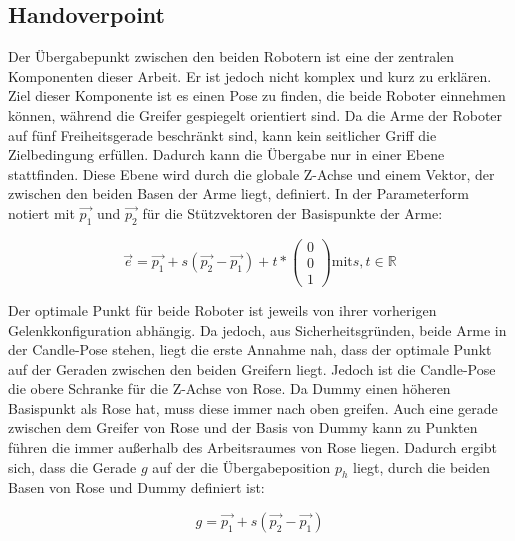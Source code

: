 \subsection{Handoverpoint}
\label{sec:impl-hop}
Der Übergabepunkt zwischen den beiden Robotern ist eine der zentralen Komponenten dieser Arbeit. Er ist jedoch nicht komplex und kurz zu erklären. Ziel dieser Komponente ist es einen Pose zu finden, die beide Roboter einnehmen können, während die Greifer gespiegelt orientiert sind. Da die Arme der Roboter auf fünf Freiheitsgerade beschränkt sind, kann kein seitlicher Griff die Zielbedingung erfüllen. Dadurch kann die Übergabe nur in einer Ebene stattfinden. Diese Ebene wird durch die globale Z-Achse und einem Vektor, der zwischen den beiden Basen der Arme liegt, definiert. In der Parameterform notiert mit $\overrightarrow{p_1}$ und $\overrightarrow{p_2}$ für die Stützvektoren der Basispunkte der Arme:

\begin{equation}
\overrightarrow{e} = \overrightarrow{p_1} + s(\overrightarrow{p_2} - \overrightarrow{p_1}) + t*\left(\begin{array}{c} 0 \\ 0 \\ 1 \end{array}\right) \text{mit} s,t \in \mathbb{R}
\end{equation}

Der optimale Punkt für beide Roboter ist jeweils von ihrer vorherigen Gelenkkonfiguration abhängig. Da jedoch, aus Sicherheitsgründen, beide Arme in der Candle-Pose stehen, liegt die erste Annahme nah, dass der optimale Punkt auf der Geraden zwischen den beiden Greifern liegt. Jedoch ist die Candle-Pose die obere Schranke für die Z-Achse von Rose. Da Dummy einen höheren Basispunkt als Rose hat, muss diese immer nach oben greifen. Auch eine gerade zwischen dem Greifer von Rose und der Basis von Dummy kann zu Punkten führen die immer außerhalb des Arbeitsraumes von Rose liegen. Dadurch ergibt sich, dass die Gerade $g$ auf der die Übergabeposition $p_h$ liegt, durch die beiden Basen von Rose und Dummy definiert ist:

\begin{equation}
g = \overrightarrow{p_1} + s(\overrightarrow{p_2} - \overrightarrow{p_1})
\end{equation}


